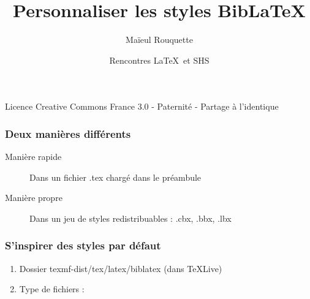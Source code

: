 \documentclass{beamer}
\author{Maïeul Rouquette}
\date{Rencontres \LaTeX\ et SHS}
\title{Personnaliser les styles Bib\LaTeX}
\institute{Université de Lausanne --- IRSB}
\newcommand{\alertdesc}[2]{\item[\alert<+>{#1}]#2}
\begin{document}
\begin{frame}
	\titlepage
	\vfill
	{\tiny Licence Creative Commons France 3.0 - Paternité - Partage à l'identique}
\end{frame}

\begin{frame}
	\frametitle{Deux manières différents}
	\begin{description}
		\alertdesc{Manière rapide}{Dans un fichier .tex chargé dans le préambule}
		\alertdesc{Manière propre}{Dans un jeu de styles redistribuables : .cbx, .bbx, .lbx}
	\end{description}
\end{frame}

\begin{frame}
	\frametitle{S'inspirer des styles par défaut}
	\begin{enumerate}
		\item<1->Dossier texmf-dist/tex/latex/biblatex (dans \TeX Live)
		\item<2->Type de fichiers :
	\end{enumerate}
\end{frame}
\end{document}
